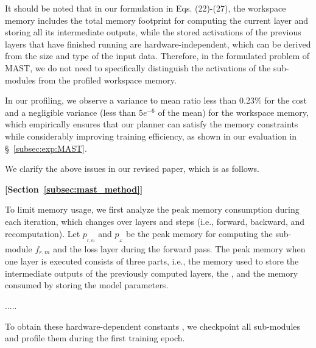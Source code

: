 \begin{sloppypar}
It should be noted that in our formulation in Eqs. (22)-(27), the workspace memory includes the total memory footprint for computing the current layer and storing all its intermediate outputs, while the stored activations of the previous layers that have finished running are hardware-independent, which can be derived from the size and type of the input data. Therefore, in the formulated problem of MAST, we do not need to specifically distinguish the activations of the sub-modules from the profiled workspace memory.     


In our profiling, we observe a variance to mean ratio less than 0.23\% for the cost and a negligible variance (less than $5e^{-6}$ of the mean) for the workspace memory, which empirically ensures that our planner can satisfy the memory constraints while considerably improving training efficiency, as shown in our evaluation in \S~\ref{subsec:exp:MAST}.

We clarify the above issues in our revised paper, which is as follows.

\begin{framed}
    \textbf{[Section~\ref{subsec:mast_method}]}

To limit memory usage, we first analyze the peak memory consumption during each iteration, which changes over layers and steps (i.e., forward, backward, and recomputation). Let $p_{_{r,m}}$ and $p_{_{\mathcal{L}}}$ be the peak memory for computing the sub-module $f_{r,m}$ and the loss layer during the forward pass. The peak memory when one layer is executed consists of
three parts, i.e., the memory used to store the intermediate outputs of the previously computed layers, the , and the memory consumed by storing the model parameters.

.....

To obtain these hardware-dependent constants , we checkpoint all sub-modules and profile them during the first training epoch.  


\end{framed}
\end{sloppypar}
